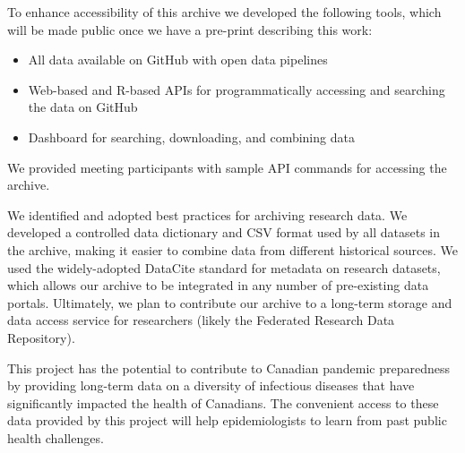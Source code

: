To enhance accessibility of this archive we developed the following tools, which will be made public once we have a pre-print describing this work:

\begin{itemize}
  \item All data available on GitHub with open data pipelines
  \item Web-based and R-based APIs for programmatically accessing and searching the data on GitHub
  \item Dashboard for searching, downloading, and combining data
\end{itemize}

We provided meeting participants with sample API commands for accessing the archive.

We identified and adopted best practices for archiving research data. We developed a controlled data dictionary and CSV format used by all datasets in the archive, making it easier to combine data from different historical sources. We used the widely-adopted DataCite standard for metadata on research datasets, which allows our archive to be integrated in any number of pre-existing data portals. Ultimately, we plan to contribute our archive to a long-term storage and data access service for researchers (likely the Federated Research Data Repository).

This project has the potential to contribute to Canadian pandemic preparedness by providing long-term data on a diversity of infectious diseases that have significantly impacted the health of Canadians. The convenient access to these data provided by this project will help epidemiologists to learn from past public health challenges.